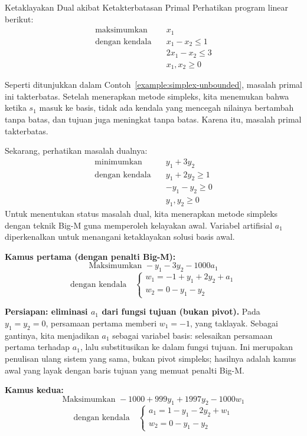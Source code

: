 \begin{example}{Ketaklayakan Dual akibat Ketakterbatasan Primal}\label{example:dual-infeasibility-unbounded}
Perhatikan program linear berikut:
\[
\begin{aligned}
\text{maksimumkan} \quad & x_1 \\
\text{dengan kendala} \quad
& x_1 - x_2 \leq 1 \\
& 2x_1 - x_2 \leq 3 \\
& x_1, x_2 \geq 0
\end{aligned}
\]

Seperti ditunjukkan dalam Contoh~\ref{example:simplex-unbounded}, masalah primal ini takterbatas. Setelah menerapkan metode simpleks, kita menemukan bahwa ketika \( s_1 \) masuk ke basis, tidak ada kendala yang mencegah nilainya bertambah tanpa batas, dan tujuan juga meningkat tanpa batas. Karena itu, masalah primal takterbatas.

Sekarang, perhatikan masalah dualnya:
\[
\begin{aligned}
\text{minimumkan} \quad & y_1 + 3y_2 \\
\text{dengan kendala} \quad
& y_1 + 2y_2 \geq 1 \\
& -y_1 - y_2 \geq 0 \\
& y_1, y_2 \geq 0
\end{aligned}
\]
Untuk menentukan status masalah dual, kita menerapkan metode simpleks dengan teknik Big-M guna memperoleh kelayakan awal. Variabel artifisial \( a_1 \) diperkenalkan untuk menangani ketaklayakan solusi basis awal.

\textbf{Kamus pertama (dengan penalti Big-M):}
\[
\text{Maksimumkan } -y_1 - 3y_2 - 1000a_1
\]
\[
\text{dengan kendala} \quad
\begin{cases}
w_1 = -1 + y_1 + 2y_2 + a_1 \\
w_2 = 0 - y_1 - y_2
\end{cases}
\]

\textbf{Persiapan: eliminasi \( a_1 \) dari fungsi tujuan (bukan pivot).} Pada \( y_1 = y_2 = 0 \), persamaan pertama memberi \( w_1 = -1 \), yang taklayak. Sebagai gantinya, kita menjadikan \( a_1 \) sebagai variabel basis: selesaikan persamaan pertama terhadap \( a_1 \), lalu substitusikan ke dalam fungsi tujuan. Ini merupakan penulisan ulang sistem yang sama, bukan pivot simpleks; hasilnya adalah kamus awal yang layak dengan baris tujuan yang memuat penalti Big-M.

\textbf{Kamus kedua:}
\[
\text{Maksimumkan } -1000 + 999y_1 + 1997y_2 - 1000w_1
\]
\[
\text{dengan kendala} \quad
\begin{cases}
a_1 = 1 - y_1 - 2y_2 + w_1 \\
w_2 = 0 - y_1 - y_2
\end{cases}
\]


\end{example}
